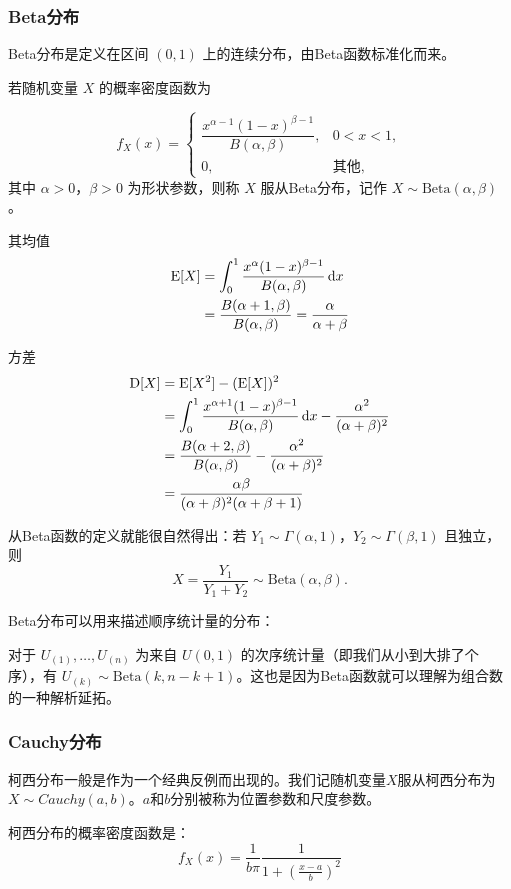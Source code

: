 \subsubsection{Beta分布}
Beta分布是定义在区间 $(0,1)$ 上的连续分布，由Beta函数标准化而来。

若随机变量 $X$ 的概率密度函数为

\[
f_X(x) = \begin{cases}
    \dfrac{x^{\alpha-1}(1-x)^{\beta-1}}{B(\alpha,\beta)}, & 0 < x < 1,\\[10pt]
    0, & \text{其他},
\end{cases}
\]
其中 $\alpha > 0$，$\beta > 0$ 为形状参数，则称 $X$ 服从Beta分布，记作 $X \sim \mathrm{Beta}(\alpha, \beta)$。

其均值
\begin{align*}
\operatorname{E}[X]&=\int_{0}^{1} \dfrac{x^{\alpha}(1-x)^{\beta-1}}{B(\alpha,\beta)}\mathop{}\!\mathrm{d} x\\
&= \frac{B(\alpha+1,\beta)}{B(\alpha,\beta)} = \dfrac{\alpha}{\alpha + \beta}
\end{align*}

方差
\begin{align*}
\operatorname{D}[X] &= \operatorname{E}[X^2]-(\operatorname{E}[X])^2 \\
&= \int_{0}^{1} \dfrac{x^{\alpha+1}(1-x)^{\beta-1}}{B(\alpha,\beta)}\mathop{}\!\mathrm{d} x-\dfrac{\alpha^2}{(\alpha + \beta)^2}\\
&= \frac{B(\alpha+2,\beta)}{B(\alpha,\beta)} - \dfrac{\alpha^2}{(\alpha + \beta)^2}\\
&= \dfrac{\alpha\beta}{(\alpha+\beta)^2(\alpha+\beta+1)}
\end{align*}

从Beta函数的定义就能很自然得出：若 $Y_1 \sim \Gamma(\alpha, 1)$，$Y_2 \sim \Gamma(\beta, 1)$ 且独立，则
\[
X = \frac{Y_1}{Y_1 + Y_2} \sim \mathrm{Beta}(\alpha, \beta).
\]

Beta分布可以用来描述顺序统计量的分布：

对于 $U_{(1)}, \dots, U_{(n)}$ 为来自 $U(0,1)$ 的次序统计量（即我们从小到大排了个序），有 $U_{(k)} \sim \mathrm{Beta}(k, n-k+1)$。这也是因为Beta函数就可以理解为组合数的一种解析延拓。

\subsubsection{Cauchy分布}
柯西分布一般是作为一个经典反例而出现的。我们记随机变量$X$服从柯西分布为$X\sim Cauchy(a, b)$。$a$和$b$分别被称为位置参数和尺度参数。

柯西分布的概率密度函数是：
\[
f_X(x) = \frac{1}{b\pi} \frac{1}{1+(\frac{x-a}{b})^2}
\]

